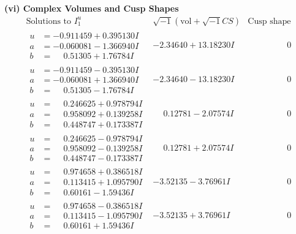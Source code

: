 \documentclass[1p]{elsarticle_modified}
\theoremstyle{definition}
\newcommand{\I}{\sqrt{-1}}
\begin{document}
\newpage\flushleft \textbf{(vi) Complex Volumes and Cusp Shapes}
$$\begin{array}{c|c|c}  
\text{Solutions to }I^u_{1}& \I (\text{vol} + \sqrt{-1}CS) & \text{Cusp shape}\\
 \hline 
\begin{aligned}
u &= -0.911459 + 0.395130 I \\
a &= -0.060081 - 1.366940 I \\
b &= \phantom{-}0.51305 + 1.76784 I\end{aligned}
 & -2.34640 + 13.18230 I & \phantom{-0.000000 } 0 \\ \hline\begin{aligned}
u &= -0.911459 - 0.395130 I \\
a &= -0.060081 + 1.366940 I \\
b &= \phantom{-}0.51305 - 1.76784 I\end{aligned}
 & -2.34640 - 13.18230 I & \phantom{-0.000000 } 0 \\ \hline\begin{aligned}
u &= \phantom{-}0.246625 + 0.978794 I \\
a &= \phantom{-}0.958092 + 0.139258 I \\
b &= \phantom{-}0.448747 + 0.173387 I\end{aligned}
 & \phantom{-}0.12781 - 2.07574 I & \phantom{-0.000000 } 0 \\ \hline\begin{aligned}
u &= \phantom{-}0.246625 - 0.978794 I \\
a &= \phantom{-}0.958092 - 0.139258 I \\
b &= \phantom{-}0.448747 - 0.173387 I\end{aligned}
 & \phantom{-}0.12781 + 2.07574 I & \phantom{-0.000000 } 0 \\ \hline\begin{aligned}
u &= \phantom{-}0.974658 + 0.386518 I \\
a &= \phantom{-}0.113415 + 1.095790 I \\
b &= \phantom{-}0.60161 - 1.59436 I\end{aligned}
 & -3.52135 - 3.76961 I & \phantom{-0.000000 } 0 \\ \hline\begin{aligned}
u &= \phantom{-}0.974658 - 0.386518 I \\
a &= \phantom{-}0.113415 - 1.095790 I \\
b &= \phantom{-}0.60161 + 1.59436 I\end{aligned}
 & -3.52135 + 3.76961 I & \phantom{-0.000000 } 0 \\ \hline\begin{aligned}

\end{aligned}
\end{array}$$
\end{document}
